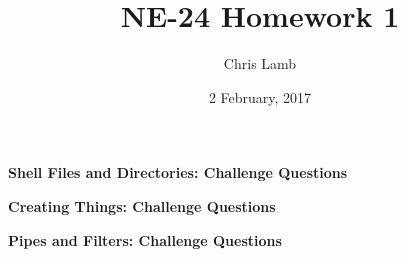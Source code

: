 \documentclass[12pt]{article}
\author{Chris Lamb}
\date{2 February, 2017}
\title{NE-24 Homework 1}
\begin{document}
\maketitle

\begin{center}
\textbf{Shell Files and Directories: Challenge Questions\\} 
\end{center}

\begin{center}
\textbf{Creating Things: Challenge Questions\\}
\end{center}

\begin{center}
\textbf{Pipes and Filters: Challenge Questions\\}
\end{center}
\end{document}
